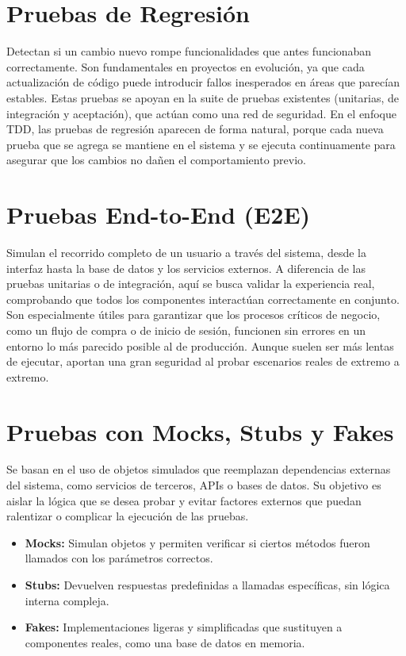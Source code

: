 \documentclass[12pt]{article} %
\begin{document}
\section*{Pruebas de Regresión}

Detectan si un cambio nuevo rompe funcionalidades que antes funcionaban correctamente. Son fundamentales en proyectos en evolución, ya que cada actualización de código puede introducir fallos inesperados en áreas que parecían estables. Estas pruebas se apoyan en la suite de pruebas existentes (unitarias, de integración y aceptación), que actúan como una red de seguridad. En el enfoque TDD, las pruebas de regresión aparecen de forma natural, porque cada nueva prueba que se agrega se mantiene en el sistema y se ejecuta continuamente para asegurar que los cambios no dañen el comportamiento previo.

\section*{Pruebas End-to-End (E2E)}

Simulan el recorrido completo de un usuario a través del sistema, desde la interfaz hasta la base de datos y los servicios externos. A diferencia de las pruebas unitarias o de integración, aquí se busca validar la experiencia real, comprobando que todos los componentes interactúan correctamente en conjunto. Son especialmente útiles para garantizar que los procesos críticos de negocio, como un flujo de compra o de inicio de sesión, funcionen sin errores en un entorno lo más parecido posible al de producción. Aunque suelen ser más lentas de ejecutar, aportan una gran seguridad al probar escenarios reales de extremo a extremo.

\section*{Pruebas con Mocks, Stubs y Fakes}

Se basan en el uso de objetos simulados que reemplazan dependencias externas del sistema, como servicios de terceros, APIs o bases de datos. Su objetivo es aislar la lógica que se desea probar y evitar factores externos que puedan ralentizar o complicar la ejecución de las pruebas. 
\begin{itemize}
  \item \textbf{Mocks:} Simulan objetos y permiten verificar si ciertos métodos fueron llamados con los parámetros correctos.
  \item \textbf{Stubs:} Devuelven respuestas predefinidas a llamadas específicas, sin lógica interna compleja.
  \item \textbf{Fakes:} Implementaciones ligeras y simplificadas que sustituyen a componentes reales, como una base de datos en memoria.
\end{itemize}
\end{document}
